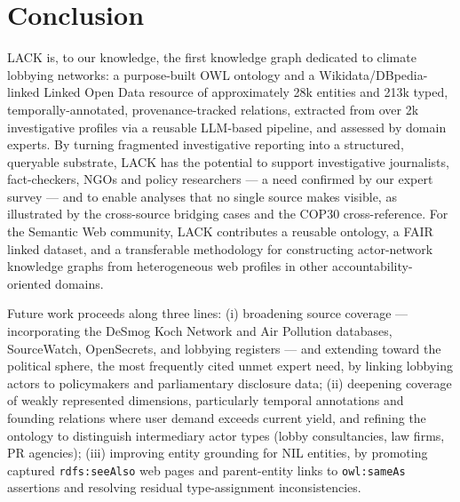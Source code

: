 \section{Conclusion}
\label{sec:conclusion}
LACK is, to our knowledge, the first knowledge graph dedicated to climate lobbying networks: a purpose-built OWL ontology and a Wikidata/DBpedia-linked Linked Open Data resource of approximately 28k entities and 213k typed, temporally-annotated, provenance-tracked relations, extracted from over 2k investigative profiles via a reusable LLM-based pipeline, and assessed by domain experts.
By turning fragmented investigative reporting into a structured, queryable substrate, LACK has the potential to support investigative journalists, fact-checkers, NGOs and policy researchers --- a need confirmed by our expert survey --- and to enable analyses that no single source makes visible, as illustrated by the cross-source bridging cases and the COP30 cross-reference.
For the Semantic Web community, LACK contributes a reusable ontology, a FAIR linked dataset, and a transferable methodology for constructing actor-network knowledge graphs from heterogeneous web profiles in other accountability-oriented domains.

Future work proceeds along three lines: (i) broadening source coverage --- incorporating the DeSmog Koch Network and Air Pollution databases, SourceWatch, OpenSecrets, and lobbying registers --- and extending toward the political sphere, the most frequently cited unmet expert need, by linking lobbying actors to policymakers and parliamentary disclosure data; (ii) deepening coverage of weakly represented dimensions, particularly temporal annotations and founding relations where user demand exceeds current yield, and refining the ontology to distinguish intermediary actor types (lobby consultancies, law firms, PR agencies); (iii) improving entity grounding for NIL entities, by promoting captured \texttt{rdfs:seeAlso} web pages and parent-entity links to \texttt{owl:sameAs} assertions and resolving residual type-assignment inconsistencies.